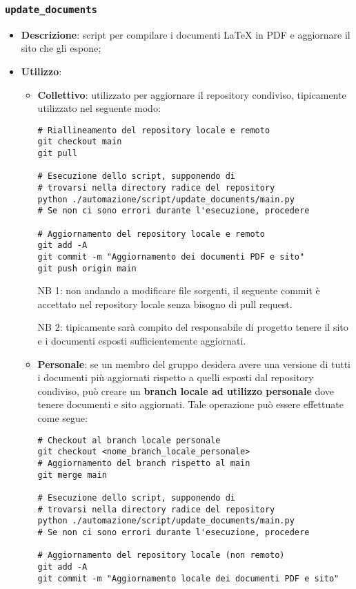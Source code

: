 \subsubsection{\texttt{update\_documents}}
\begin{itemize}
    \item \textbf{Descrizione}: script per compilare i documenti LaTeX in PDF e aggiornare il sito che gli espone;
    \item \textbf{Utilizzo}:
    \begin{itemize}
        \item \textbf{Collettivo}: utilizzato per aggiornare il repository condiviso, tipicamente utilizzato nel seguente modo:
\begin{Verbatim}[fontsize=\small]
# Riallineamento del repository locale e remoto
git checkout main
git pull

# Esecuzione dello script, supponendo di 
# trovarsi nella directory radice del repository
python ./automazione/script/update_documents/main.py
# Se non ci sono errori durante l'esecuzione, procedere

# Aggiornamento del repository locale e remoto
git add -A
git commit -m "Aggiornamento dei documenti PDF e sito"
git push origin main
\end{Verbatim}

        NB 1: non andando a modificare file sorgenti, il seguente commit è accettato nel repository locale senza bisogno di pull request.
        
        NB 2: tipicamente sarà compito del responsabile di progetto tenere il sito e i documenti esposti sufficientemente aggiornati.

        \item \textbf{Personale}: se un membro del gruppo desidera avere una versione di tutti i documenti più aggiornati rispetto a quelli esposti dal repository condiviso, può creare un \textbf{branch locale ad utilizzo personale} dove tenere documenti e sito aggiornati. Tale operazione può essere effettuate come segue:
\begin{Verbatim}[fontsize=\small]
# Checkout al branch locale personale
git checkout <nome_branch_locale_personale>
# Aggiornamento del branch rispetto al main
git merge main

# Esecuzione dello script, supponendo di 
# trovarsi nella directory radice del repository
python ./automazione/script/update_documents/main.py
# Se non ci sono errori durante l'esecuzione, procedere

# Aggiornamento del repository locale (non remoto)
git add -A
git commit -m "Aggiornamento locale dei documenti PDF e sito"
\end{Verbatim}
    \end{itemize}
\end{itemize}


